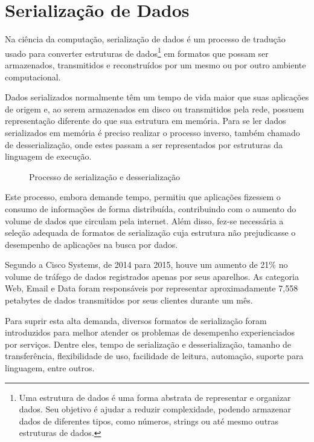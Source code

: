 \section[Serialização de Dados]{Serialização de Dados}

Na ciência da computação, serialização de dados é um processo de tradução usado para converter estruturas de dados\footnote{
  Uma estrutura de dados é uma forma abstrata de representar e organizar dados. Seu objetivo é ajudar a reduzir complexidade, podendo armazenar dados de diferentes tipos, como números, strings ou até mesmo outras estruturas de dados.
} em formatos que possam ser armazenados, transmitidos e reconstruídos por um mesmo ou por outro ambiente computacional. \cite{Cline2016}

Dados serializados normalmente têm um tempo de vida maior que suas aplicações de origem e, ao serem armazenados em disco ou transmitidos pela rede, possuem representação diferente do que sua estrutura em memória. Para se ler dados serializados em memória é preciso realizar o processo inverso, também chamado de desserialização, onde estes passam a ser representados por estruturas da linguagem de execução. \cite{Guller2016}
  
\begin{figure}[H]
  \centering
  \caption{Processo de serialização e desserialização}
\end{figure}

Este processo, embora demande tempo, permitiu que aplicações fizessem o consumo de informações de forma distribuída, contribuindo com o aumento do volume de dados que circulam pela internet. Além disso, fez-se necessária a seleção adequada de formatos de serialização cuja estrutura não prejudicasse o desempenho de aplicações na busca por dados. \cite{SumarayMakki2012}

Segundo a Cisco Systems, de 2014 para 2015, houve um aumento de 21\% no volume de tráfego de dados registrados apenas por seus aparelhos. As categoria Web, Email e Data foram responsáveis por representar aproximadamente 7,558 petabytes de dados transmitidos por seus clientes durante um mês. \cite{Cisco2016}

Para suprir esta alta demanda, diversos formatos de serialização foram introduzidos para melhor atender os problemas de desempenho experienciados por serviços. Dentre eles, tempo de serialização e desserialização, tamanho de transferência, flexibilidade de uso, facilidade de leitura, automação, suporte para linguagem, entre outros. \cite{Guller2016}

